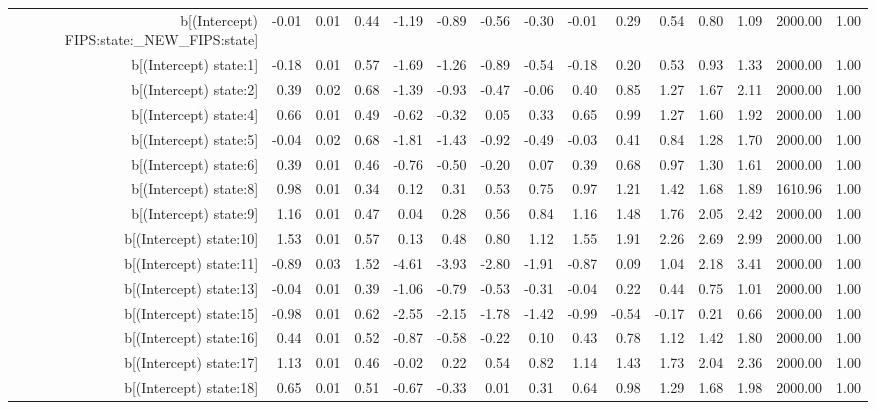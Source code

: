 \begin{table}[ht]
\begin{tabular}{rrrrrrrrrrrrrrr}
  b[(Intercept) FIPS:state:\_NEW\_FIPS:state] & -0.01 & 0.01 & 0.44 & -1.19 & -0.89 & -0.56 & -0.30 & -0.01 & 0.29 & 0.54 & 0.80 & 1.09 & 2000.00 & 1.00 \\ 
  b[(Intercept) state:1] & -0.18 & 0.01 & 0.57 & -1.69 & -1.26 & -0.89 & -0.54 & -0.18 & 0.20 & 0.53 & 0.93 & 1.33 & 2000.00 & 1.00 \\ 
  b[(Intercept) state:2] & 0.39 & 0.02 & 0.68 & -1.39 & -0.93 & -0.47 & -0.06 & 0.40 & 0.85 & 1.27 & 1.67 & 2.11 & 2000.00 & 1.00 \\ 
  b[(Intercept) state:4] & 0.66 & 0.01 & 0.49 & -0.62 & -0.32 & 0.05 & 0.33 & 0.65 & 0.99 & 1.27 & 1.60 & 1.92 & 2000.00 & 1.00 \\ 
  b[(Intercept) state:5] & -0.04 & 0.02 & 0.68 & -1.81 & -1.43 & -0.92 & -0.49 & -0.03 & 0.41 & 0.84 & 1.28 & 1.70 & 2000.00 & 1.00 \\ 
  b[(Intercept) state:6] & 0.39 & 0.01 & 0.46 & -0.76 & -0.50 & -0.20 & 0.07 & 0.39 & 0.68 & 0.97 & 1.30 & 1.61 & 2000.00 & 1.00 \\ 
  b[(Intercept) state:8] & 0.98 & 0.01 & 0.34 & 0.12 & 0.31 & 0.53 & 0.75 & 0.97 & 1.21 & 1.42 & 1.68 & 1.89 & 1610.96 & 1.00 \\ 
  b[(Intercept) state:9] & 1.16 & 0.01 & 0.47 & 0.04 & 0.28 & 0.56 & 0.84 & 1.16 & 1.48 & 1.76 & 2.05 & 2.42 & 2000.00 & 1.00 \\ 
  b[(Intercept) state:10] & 1.53 & 0.01 & 0.57 & 0.13 & 0.48 & 0.80 & 1.12 & 1.55 & 1.91 & 2.26 & 2.69 & 2.99 & 2000.00 & 1.00 \\ 
  b[(Intercept) state:11] & -0.89 & 0.03 & 1.52 & -4.61 & -3.93 & -2.80 & -1.91 & -0.87 & 0.09 & 1.04 & 2.18 & 3.41 & 2000.00 & 1.00 \\ 
  b[(Intercept) state:13] & -0.04 & 0.01 & 0.39 & -1.06 & -0.79 & -0.53 & -0.31 & -0.04 & 0.22 & 0.44 & 0.75 & 1.01 & 2000.00 & 1.00 \\ 
  b[(Intercept) state:15] & -0.98 & 0.01 & 0.62 & -2.55 & -2.15 & -1.78 & -1.42 & -0.99 & -0.54 & -0.17 & 0.21 & 0.66 & 2000.00 & 1.00 \\ 
  b[(Intercept) state:16] & 0.44 & 0.01 & 0.52 & -0.87 & -0.58 & -0.22 & 0.10 & 0.43 & 0.78 & 1.12 & 1.42 & 1.80 & 2000.00 & 1.00 \\ 
  b[(Intercept) state:17] & 1.13 & 0.01 & 0.46 & -0.02 & 0.22 & 0.54 & 0.82 & 1.14 & 1.43 & 1.73 & 2.04 & 2.36 & 2000.00 & 1.00 \\ 
  b[(Intercept) state:18] & 0.65 & 0.01 & 0.51 & -0.67 & -0.33 & 0.01 & 0.31 & 0.64 & 0.98 & 1.29 & 1.68 & 1.98 & 2000.00 & 1.00 \\ 

\end{tabular}
\end{table}
